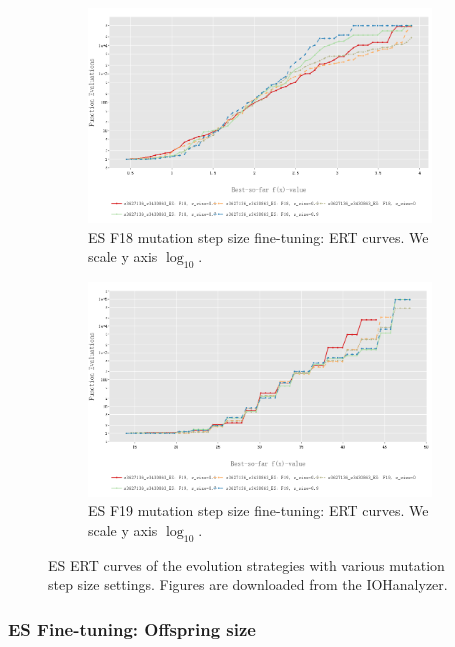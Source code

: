 \documentclass{article}
\begin{document}
\begin{figure}[!ht]
    \begin{subfigure}[h]{0.95\linewidth}
        \includegraphics[width=\linewidth]{es/f18/ERT18ss.png}
        \caption{ES F18 mutation step size fine-tuning: ERT curves. We scale y axis $\log_{10}$.}
    \end{subfigure}
    \hfill
    \begin{subfigure}[h]{0.95\linewidth}
        \includegraphics[width=\linewidth]{es/f19/ERT19ss.png}
        \caption{ES F19 mutation step size fine-tuning: ERT curves. We scale y axis $\log_{10}$.}
    \end{subfigure}
    \caption{ES ERT curves of the evolution strategies with various mutation step size settings. Figures are downloaded from the IOHanalyzer.}
    \label{fig:experi-es-ssize-ert}
\end{figure}

\subsubsection{ES Fine-tuning: Offspring size}
\end{document}
